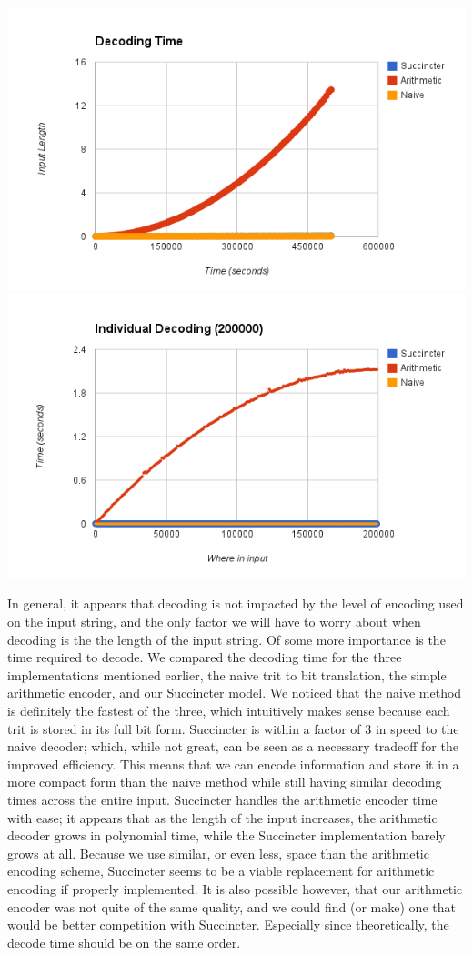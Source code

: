 \documentclass{article}
\begin{document}
\includegraphics[scale=0.4]{images/decoding_time}
\includegraphics[scale=0.4]{images/individual_decode_20000}
\afterpage{\vfill}

In general, it appears that decoding is not impacted by the level of encoding used on the input string, and the only factor we will have to worry about when decoding is the the length of the input string. Of some more importance is the time required to decode. We compared the decoding time for the three implementations mentioned earlier, the naive trit to bit translation, the simple arithmetic encoder, and our Succincter model. We noticed that the naive method is definitely the fastest of the three, which intuitively makes sense because each trit is stored in its full bit form. Succincter is within a factor of 3 in speed to the naive decoder; which, while not great, can be seen as a necessary tradeoff for the improved efficiency. This means that we can encode information and store it in a more compact form than the naive method while still having similar decoding times across the entire input. Succincter handles the arithmetic encoder time with ease; it appears that as the length of the input increases, the arithmetic decoder grows in polynomial time, while the Succincter implementation barely grows at all. Because we use similar, or even less, space than the arithmetic encoding scheme, Succincter seems to be a viable replacement for arithmetic encoding if properly implemented. It is also possible however, that our arithmetic encoder was not quite of the same quality, and we could find (or make) one that would be better competition with Succincter. Especially since theoretically, the decode time should be on the same order.\\
\end{document}
